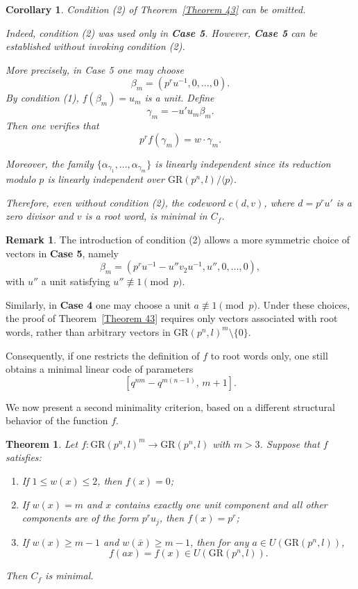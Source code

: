 \documentclass[10pt]{article}
\newtheorem{theorem}[lem]{Theorem}
\newtheorem{coro}[lem]{Corollary}
\theoremstyle{definition}
\newtheorem{remark}[lem]{Remark}
\begin{document}
\begin{coro}
Condition {\rm (2)} of Theorem~\ref{Theorem 43} can be omitted.

Indeed, condition {\rm (2)} was used only in {\bf Case 5}.
However, {\bf Case 5} can be established without invoking condition {\rm (2)}.

More precisely, in Case 5 one may choose
\[
\beta_m=(p^ru^{-1},0,\dots,0).
\]
By condition {\rm (1)}, $f(\beta_m)=u_m$ is a unit.
Define
\[
\gamma_m=-u' u_m \beta_m.
\]
Then one verifies that
\[
p^r f(\gamma_m)=w\cdot \gamma_m.
\]

Moreover, the family
$\{\alpha_{\gamma_1},\dots,\alpha_{\gamma_m}\}$
is linearly independent since its reduction modulo $p$
is linearly independent over
$\mathrm{GR}(p^n,l)/\langle p\rangle$.

Therefore, even without condition {\rm (2)},
the codeword $c(d,v)$, where $d=p^ru'$ is a zero divisor
and $v$ is a root word, is minimal in $C_f$.
\end{coro}

\begin{remark}
The introduction of condition {\rm (2)} allows a more symmetric
choice of vectors in {\bf Case 5}, namely
\[
\beta_m=(p^ru^{-1}-u''v_2u^{-1},u'',0,\dots,0),
\]
with $u''$ a unit satisfying $u''\not\equiv 1 \pmod p$.

Similarly, in {\bf Case 4} one may choose a unit
$a\not\equiv 1\pmod p$.
Under these choices, the proof of Theorem~\ref{Theorem 43}
requires only vectors associated with root words,
rather than arbitrary vectors in
$\mathrm{GR}(p^n,l)^m\setminus\{0\}$.

Consequently, if one restricts the definition of $f$
to root words only,
one still obtains a minimal linear code
of parameters
\[
[q^{nm}-q^{m(n-1)},\,m+1].
\]
\end{remark}

\medskip

We now present a second minimality criterion,
based on a different structural behavior of the function $f$.

\begin{theorem}\label{Theorem 46}
Let $f:\mathrm{GR}(p^n,l)^m\to \mathrm{GR}(p^n,l)$
with $m>3$. Suppose that $f$ satisfies:

\begin{enumerate}
\item If $1\le w(x)\le 2$, then $f(x)=0$;

\item If $w(x)=m$ and $x$ contains exactly one unit component
      and all other components are of the form $p^ru_j$,
      then $f(x)=p^r$;

\item If $w(x)\ge m-1$ and $w(\bar{x})\ge m-1$, then
      for any $a\in U(\mathrm{GR}(p^n,l))$,
      \[
      f(ax)=f(x)\in U(\mathrm{GR}(p^n,l)).
      \]
\end{enumerate}

Then $C_f$ is minimal.
\end{theorem}
\end{document}
